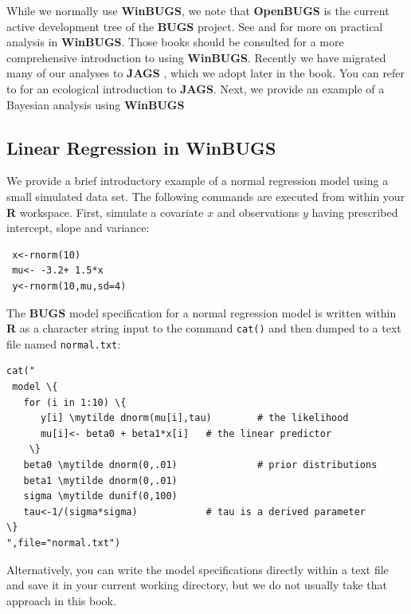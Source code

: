 While we normally use {\bf WinBUGS}, we note that {\bf OpenBUGS} is
the current active development tree of the {\bf BUGS} project. See
\citet[][]{kery:2010} and \citet[][especially
App. 1]{kery_schaub:2011} for more on practical analysis in {\bf
  WinBUGS}.  Those books should be consulted for a more comprehensive
introduction to using {\bf WinBUGS}.  Recently we have migrated many
of our analyses to {\bf JAGS} \citep{plummer:2009}, which we adopt
later in the book. You can refer to \citet{hobbs:2011} for an
ecological introduction to {\bf JAGS}.  Next, we provide an example of
a Bayesian analysis using {\bf WinBUGS}

\subsection{Linear Regression in WinBUGS}
\label{GLMM.sect.linear}

We provide a brief introductory example of a normal regression model
using a small simulated data set. The following commands are executed
from within your {\bf R} workspace.
First, simulate a covariate $x$ and observations $y$ having
prescribed intercept, slope and variance:
\begin{verbatim}
 x<-rnorm(10)
 mu<- -3.2+ 1.5*x
 y<-rnorm(10,mu,sd=4)
\end{verbatim}
The {\bf BUGS} model specification for a normal regression model is
written within {\bf R} as a character string input to the command
\mbox{\tt cat()} and
then dumped to a text file named \mbox{\tt normal.txt}:
\begin{Verbatim}[commandchars=\\\{\}] 
cat("
 model \{ 
   for (i in 1:10) \{ 
      y[i] \mytilde dnorm(mu[i],tau)        # the likelihood
      mu[i]<- beta0 + beta1*x[i]   # the linear predictor
    \}
   beta0 \mytilde dnorm(0,.01)              # prior distributions
   beta1 \mytilde dnorm(0,.01)
   sigma \mytilde dunif(0,100)
   tau<-1/(sigma*sigma)            # tau is a derived parameter
\}
",file="normal.txt")
\end{Verbatim}
Alternatively, you
can write the model specifications directly within a text file and
save it in your current working directory, but we do not usually take
that approach in this book.

